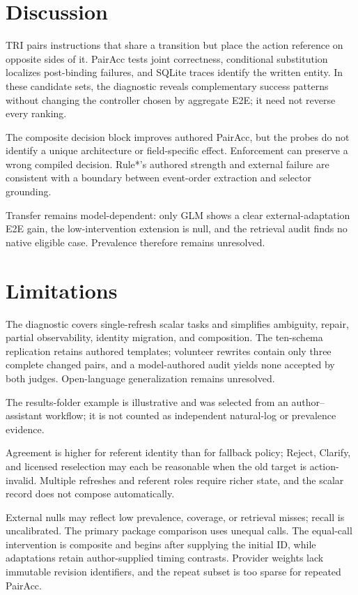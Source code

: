 \documentclass[letterpaper]{article}
\begin{document}
\section{Discussion}

TRI pairs instructions that share a transition but place the action reference on opposite sides of
it. PairAcc tests joint correctness, conditional substitution localizes post-binding failures, and
SQLite traces identify the written entity. In these candidate sets, the diagnostic reveals
complementary success patterns without changing the controller chosen by aggregate E2E; it need
not reverse every ranking.

The composite decision block improves authored PairAcc, but the probes do not identify a unique
architecture or field-specific effect. Enforcement can preserve a wrong compiled decision. Rule*'s
authored strength and external failure are consistent with a boundary between event-order
extraction and selector grounding.

Transfer remains model-dependent: only GLM shows a clear external-adaptation E2E gain, the
low-intervention extension is null, and the retrieval audit finds no native eligible case.
Prevalence therefore remains unresolved.

\section{Limitations}

The diagnostic covers single-refresh scalar tasks and simplifies ambiguity, repair, partial
observability, identity migration, and composition. The ten-schema replication retains authored
templates; volunteer rewrites contain only three complete changed pairs, and a model-authored audit
yields none accepted by both judges. Open-language generalization remains unresolved.

The results-folder example is illustrative and was selected from an author--assistant workflow;
it is not counted as independent natural-log or prevalence evidence.

Agreement is higher for referent identity than for fallback policy; Reject, Clarify, and
licensed reselection may each be reasonable when the old target is action-invalid. Multiple
refreshes and referent roles require richer state, and the scalar record does not compose automatically.

External nulls may reflect low prevalence, coverage, or retrieval misses; recall is uncalibrated.
The primary package comparison uses unequal calls. The equal-call intervention is composite and
begins after supplying the initial ID, while adaptations retain author-supplied timing contrasts.
Provider weights lack immutable revision identifiers, and the repeat subset is too sparse for
repeated PairAcc.
\end{document}
